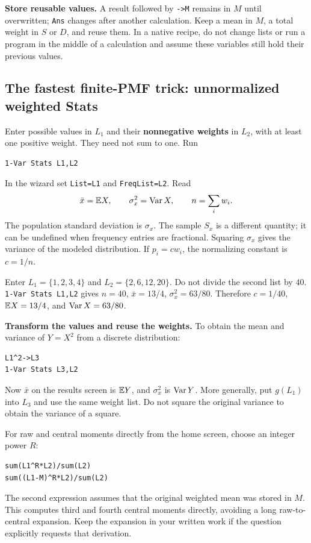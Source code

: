 \textbf{Store reusable values.} A result followed by \texttt{->M} remains in $M$ until overwritten; \texttt{Ans} changes after another calculation. Keep a mean in $M$, a total weight in $S$ or $D$, and reuse them. In a native recipe, do not change lists or run a program in the middle of a calculation and assume these variables still hold their previous values.

\subsection{The fastest finite-PMF trick: unnormalized weighted Stats}
Enter possible values in $L_1$ and their \textbf{nonnegative weights} in $L_2$, with at least one positive weight. They need not sum to one. Run
\begin{verbatim}
1-Var Stats L1,L2
\end{verbatim}
In the wizard set \texttt{List=L1} and \texttt{FreqList=L2}. Read
\[
\bar x=\mathbb E X,\qquad \sigma_x^2=\operatorname{Var} X,\qquad n=\sum_iw_i.
\]
The population standard deviation is $\sigma_x$. The sample $S_x$ is a different quantity; it can be undefined when frequency entries are fractional. Squaring $\sigma_x$ gives the variance of the modeled distribution. If $p_i=cw_i$, the normalizing constant is $c=1/n$.

\begin{example}
Enter $L_1=\{1,2,3,4\}$ and $L_2=\{2,6,12,20\}$. Do not divide the second list by 40. \texttt{1-Var Stats L1,L2} gives $n=40$, $\bar x=13/4$, $\sigma_x^2=63/80$. Therefore $c=1/40$, $\mathbb E X=13/4$, and $\operatorname{Var} X=63/80$.
\end{example}

\textbf{Transform the values and reuse the weights.} To obtain the mean and variance of $Y=X^2$ from a discrete distribution:
\begin{verbatim}
L1^2->L3
1-Var Stats L3,L2
\end{verbatim}
Now $\bar x$ on the results screen is $\mathbb E Y$, and $\sigma_x^2$ is $\operatorname{Var} Y$. More generally, put $g(L_1)$ into $L_3$ and use the same weight list. Do not square the original variance to obtain the variance of a square.

For raw and central moments directly from the home screen, choose an integer power $R$:
\begin{verbatim}
sum(L1^R*L2)/sum(L2)
sum((L1-M)^R*L2)/sum(L2)
\end{verbatim}
The second expression assumes that the original weighted mean was stored in $M$. This computes third and fourth central moments directly, avoiding a long raw-to-central expansion. Keep the expansion in your written work if the question explicitly requests that derivation.

